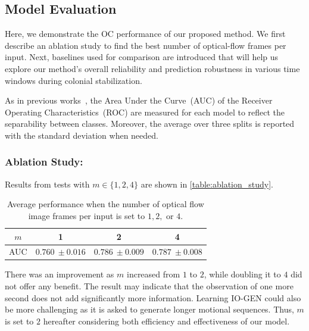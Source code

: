 \documentclass[letterpaper]{article} %
\let\orgautoref\autoref
\renewcommand{\autoref}
{\def\equationautorefname{Equation}%
	\def\figureautorefname{Fig.}%
	\def\subfigureautorefname{Fig.}%
	\def\Itemautorefname{item}%
	\def\tableautorefname{Table}%
	\def\exerciseautorefname{Exercise}%
	\def\starexerciseautorefname{Exercise}%
	\def\sectionautorefname{Section}%
	\def\subsectionautorefname{Section}%
	\def\subsubsectionautorefname{Section}%
	\def\chapterautorefname{Section}%
	\def\partautorefname{Part}%
	\orgautoref}
\begin{document}
\subsection{Model Evaluation}
\label{sec:model_evaluation}

Here, we demonstrate the OC performance of our proposed method. We first
describe an ablation study to find the best number of optical-flow
frames per input. Next, baselines used for comparison are introduced
that will help us explore our method's overall reliability and
prediction robustness in various time windows during colonial
stabilization.

As in previous works~\citep{RVGDSBMK18}, the Area Under the Curve~(AUC) 
of the Receiver Operating Characteristics~(ROC) are measured for 
each model to reflect the separability between classes. Moreover, 
the average over three splits is reported with the standard 
deviation when needed.

\subsubsection{Ablation Study:}
\label{sec:ablation_study}
%
Results from tests with $m \in \{1, 2, 4\}$ are shown in
\autoref{table:ablation_study}.
%
\setlength{\tabcolsep}{0.5em} %
{\renewcommand{\arraystretch}{1.2}%
	\begin{table}
		\centering
		\begin{tabular}{|c|c|c|c|} 
			\hline
			$m$  &  1 & 2 & 4  \\ \hline\hline
			AUC & $0.760~\pm 0.016$ & $0.786~\pm 0.009$ & $0.787~\pm 0.008$ 
			\\ \hline
		\end{tabular}
		\caption{Average performance when the number of optical flow 
		image frames per input is set to $1, 2,$ or $4$.}
		\label{table:ablation_study}
	\end{table}
}%
There was an improvement as $m$ increased from $1$ to $2$,
while doubling it to $4$ did not offer any benefit. The result may
indicate that the observation of one more second does not add
significantly more information. Learning \mbox{IO-GEN} could also be more
challenging as it is asked to generate longer motional sequences.  Thus,
$m$ is set to $2$ hereafter considering both efficiency and
effectiveness of our model.
\end{document}
